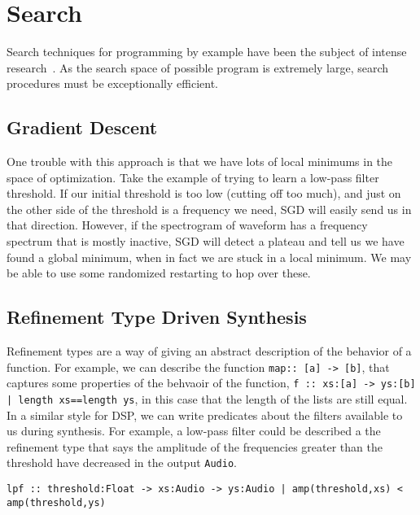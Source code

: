 \section{Search}

Search techniques for programming by example have been the subject of intense research~\cite{?,?,?}.
As the search space of possible program is extremely large, search procedures must be exceptionally efficient. 


\subsection{Gradient Descent}

One trouble with this approach is that we have lots of local minimums in the space of optimization.
Take the example of trying to learn a low-pass filter threshold.
If our initial threshold is too low (cutting off too much), and just on the other side of the threshold is a frequency we need, SGD will easily send us in that direction.
However, if the spectrogram of waveform has a frequency spectrum that is mostly inactive, SGD will detect a plateau and tell us we have found a global minimum, when in fact we are stuck in a local minimum.
We may be able to use some randomized restarting to hop over these.

\subsection{Refinement Type Driven Synthesis}

Refinement types are a way of giving an abstract description of the behavior of a function.
For example, we can describe the function \texttt{map:: [a] -> [b]}, that captures some properties of the behvaoir of the function, \texttt{f :: xs:[a] -> ys:[b] | length xs==length ys}, in this case that the length of the lists are still equal.
In a similar style for DSP, we can write predicates about the filters available to us during synthesis.
For example, a low-pass filter could be described a the refinement type that says the amplitude of the frequencies greater than the threshold have decreased in the output \texttt{Audio}.

\texttt{lpf :: threshold:Float -> xs:Audio -> ys:Audio | amp(threshold,xs) < amp(threshold,ys)}





